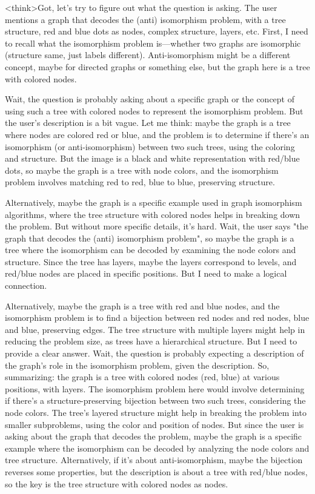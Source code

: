 <think>Got, let's try to figure out what the question is asking. The user mentions a graph that decodes the (anti) isomorphism problem, with a tree structure, red and blue dots as nodes, complex structure, layers, etc. First, I need to recall what the isomorphism problem is—whether two graphs are isomorphic (structure same, just labels different). Anti-isomorphism might be a different concept, maybe for directed graphs or something else, but the graph here is a tree with colored nodes.

Wait, the question is probably asking about a specific graph or the concept of using such a tree with colored nodes to represent the isomorphism problem. But the user's description is a bit vague. Let me think: maybe the graph is a tree where nodes are colored red or blue, and the problem is to determine if there's an isomorphism (or anti-isomorphism) between two such trees, using the coloring and structure. But the image is a black and white representation with red/blue dots, so maybe the graph is a tree with node colors, and the isomorphism problem involves matching red to red, blue to blue, preserving structure.

Alternatively, maybe the graph is a specific example used in graph isomorphism algorithms, where the tree structure with colored nodes helps in breaking down the problem. But without more specific details, it's hard. Wait, the user says "the graph that decodes the (anti) isomorphism problem", so maybe the graph is a tree where the isomorphism can be decoded by examining the node colors and structure. Since the tree has layers, maybe the layers correspond to levels, and red/blue nodes are placed in specific positions. But I need to make a logical connection.

Alternatively, maybe the graph is a tree with red and blue nodes, and the isomorphism problem is to find a bijection between red nodes and red nodes, blue and blue, preserving edges. The tree structure with multiple layers might help in reducing the problem size, as trees have a hierarchical structure. But I need to provide a clear answer. Wait, the question is probably expecting a description of the graph's role in the isomorphism problem, given the description. So, summarizing: the graph is a tree with colored nodes (red, blue) at various positions, with layers. The isomorphism problem here would involve determining if there's a structure-preserving bijection between two such trees, considering the node colors. The tree's layered structure might help in breaking the problem into smaller subproblems, using the color and position of nodes. But since the user is asking about the graph that decodes the problem, maybe the graph is a specific example where the isomorphism can be decoded by analyzing the node colors and tree structure. Alternatively, if it's about anti-isomorphism, maybe the bijection reverses some properties, but the description is about a tree with red/blue nodes, so the key is the tree structure with colored nodes as nodes.

